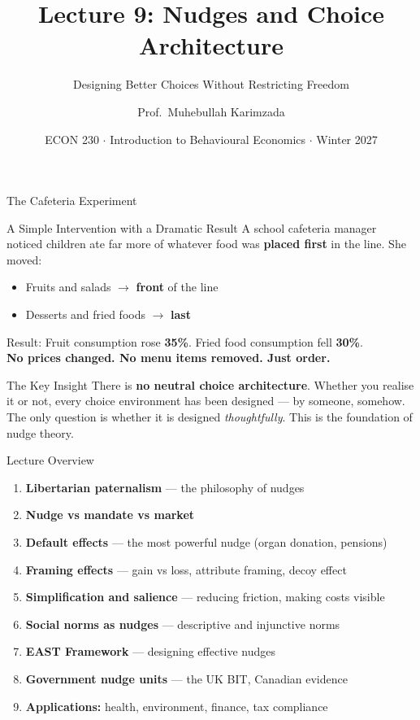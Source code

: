 \documentclass[aspectratio=169]{beamer}
\title{\textbf{Lecture 9: Nudges and Choice Architecture}}
\subtitle{Designing Better Choices Without Restricting Freedom}
\author{Prof.\ Muhebullah Karimzada}
\institute{School of Economics, University of Northern British Columbia}
\date{ECON 230 $\cdot$ Introduction to Behavioural Economics $\cdot$ Winter 2027}
\begin{document}
\begin{frame}[plain]\titlepage\end{frame}

\begin{frame}{The Cafeteria Experiment}
\begin{alertblock}{A Simple Intervention with a Dramatic Result}
A school cafeteria manager noticed children ate far more of whatever food was \textbf{placed first} in the line. She moved:
\begin{itemize}
  \item Fruits and salads $\to$ \textbf{front} of the line
  \item Desserts and fried foods $\to$ \textbf{last}
\end{itemize}
Result: Fruit consumption rose \textbf{35\%}. Fried food consumption fell \textbf{30\%}.\\[0.4em]
\textbf{No prices changed. No menu items removed. Just order.}
\end{alertblock}
\begin{block}{The Key Insight}
There is \textbf{no neutral choice architecture}. Whether you realise it or not, every choice environment has been designed --- by someone, somehow. The only question is whether it is designed \textit{thoughtfully}. This is the foundation of nudge theory.
\end{block}
\end{frame}

\begin{frame}{Lecture Overview}
\begin{enumerate}[<+->]
  \item \textbf{Libertarian paternalism} --- the philosophy of nudges
  \item \textbf{Nudge vs mandate vs market}
  \item \textbf{Default effects} --- the most powerful nudge (organ donation, pensions)
  \item \textbf{Framing effects} --- gain vs loss, attribute framing, decoy effect
  \item \textbf{Simplification and salience} --- reducing friction, making costs visible
  \item \textbf{Social norms as nudges} --- descriptive and injunctive norms
  \item \textbf{EAST Framework} --- designing effective nudges
  \item \textbf{Government nudge units} --- the UK BIT, Canadian evidence
  \item \textbf{Applications:} health, environment, finance, tax compliance
\end{enumerate}
\end{frame}
\end{document}
